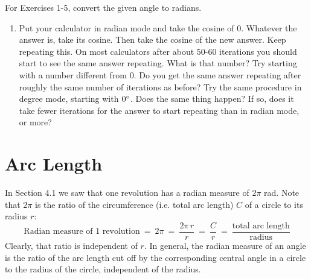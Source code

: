 \startexercises\label{sec4dot1}
\vspace{5mm}
{\small
\par\noindent For Exercises 1-5, convert the given angle to radians.
\begin{enumerate}[\bfseries 1.]
 For Exercises 6-10, convert the given angle to degrees.
[{[\bfseries 1.]}]
 \item\label{exer:cosxeqx}
 Put your calculator in radian mode and take the cosine of $0$. Whatever the answer is, take
 its cosine. Then take the cosine of the new answer. Keep repeating this. On most calculators after
 about $50$-$60$ iterations you should start to see the same answer repeating. What is that
 number? Try starting with a number different from $0$. Do you get the same answer repeating after
 roughly the same number of iterations as before? Try the same procedure in degree mode, starting
 with $0^\circ$. Does the same thing happen? If so, does it take fewer iterations for the answer
 to start repeating than in radian mode, or more?
\end{enumerate}}

\newpage
\section{Arc Length}
In Section 4.1 we saw that one revolution has a radian measure of $2\pi$ rad. Note that $2\pi$
is the ratio of the circumference (i.e. total arc length) $C$ of a circle to its radius $r$:
\begin{displaymath}
 \text{Radian measure of 1 revolution} ~=~ 2\pi ~=~ \frac{2\pi\,r}{r} ~=~
  \frac{C}{r} ~=~ \frac{\text{total arc length}}{\text{radius}}
\end{displaymath}
Clearly, that ratio is independent of $r$.
In general, the radian measure of an angle is the ratio of the arc length cut off by the
corresponding central angle in a circle to the radius of the circle, independent of the radius.

